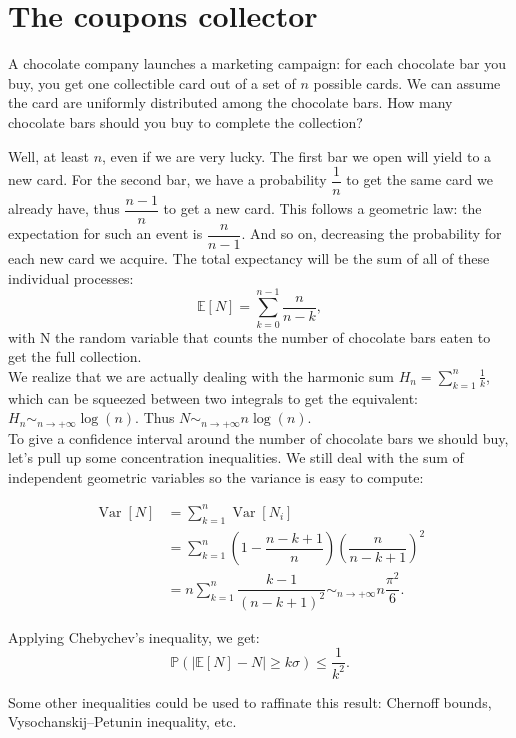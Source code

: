 \section{The coupons collector}

\begin{tcolorbox}[width=\linewidth, sharp corners=all, colback=white!95!black]
A chocolate company launches a marketing campaign: for each chocolate bar you buy, you get one collectible card out of a set of $n$ possible cards. We can assume the card are uniformly distributed among the chocolate bars.\newline
How many chocolate bars should you buy to complete the collection?
\end{tcolorbox}

Well, at least $n$, even if we are very lucky.\newline
The first bar we open will yield to a new card. For the second bar, we have a probability $\dfrac{1}{n}$ to get the same card we already have, thus $\dfrac{n-1}{n}$ to get a new card. This follows a geometric law: the expectation for such an event is $\dfrac{n}{n-1}$. And so on, decreasing the probability for each new card we acquire.\newline
The total expectancy will be the sum of all of these individual processes: 
$$\mathbb{E}\left[ N \right] = \displaystyle \sum_{k=0}^{n-1} \dfrac{n}{n-k},$$
with N the random variable that counts the number of chocolate bars eaten to get the full collection.\\

We realize that we are actually dealing with the harmonic sum $H_n = \sum_{k=1}^{n} \frac1{k}$, which can be squeezed between two integrals to get the equivalent: $H_n \sim_{n \to +\infty} \log(n).$\newline
Thus $N \sim_{n \to +\infty} n\log(n).$\\

To give a confidence interval around the number of chocolate bars we should buy, let's pull up some concentration inequalities.\newline
We still deal with the sum of independent geometric variables so the variance is easy to compute:

\begin{align*}
    \operatorname{Var}[N] &= \displaystyle \sum_{k=1}^n \operatorname{Var}[N_i]\\
    &= \displaystyle \sum_{k=1}^n \left(1 - \dfrac{n-k+1}{n}\right)\left(\dfrac{n}{n-k+1}\right)^2\\
    &= n\displaystyle \sum_{k=1}^n \dfrac{k-1}{(n-k+1)^2} \sim_{n \to +\infty} n \dfrac{\pi^2}{6}. 
\end{align*}

Applying Chebychev's inequality, we get: $$\mathbb{P}(\lvert \mathbb{E}[N] - N \rvert \geq k \sigma) \leq \dfrac{1}{k^2}.$$

Some other inequalities could be used to raffinate this result: Chernoff bounds, Vysochanskij–Petunin inequality, etc.


